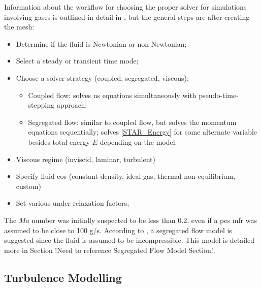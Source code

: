 \documentclass[double,12pt]{beavtex}
\begin{document}
Information about the workflow for choosing the proper solver for simulations involving gases is outlined in detail in \cite{cd-adapco}, but the general steps are after creating the mesh:
\begin{itemize}
    \item Determine if the fluid is Newtonian or non-Newtonian;
    \item Select a steady or transient time mode;
    \item Choose a solver strategy (coupled, segregated, viscous):
    \begin{itemize}
        \item Coupled flow: solves \acrshort{ns} equations simultaneously with pseudo-time-stepping approach;
        \item Segregated flow: similar to coupled flow, but solves the momentum equations sequentially; solves \ref{STAR_Energy} for some alternate variable besides total energy $E$ depending on the model:
    \end{itemize}
    \item Viscous regime (inviscid, laminar, turbulent)
    \item Specify fluid \acrshort{eos} (constant density, ideal gas, thermal non-equilibrium, custom)
    \item Set various under-relaxation factors;
\end{itemize}

The $Ma$ number was initially suspected to be less than 0.2, even if a \acrshort{pcs} \acrshort{mfr} was assumed to be close to 100 g/s. According to \cite{cd-adapco}, a segregated flow model is suggested since the fluid is assumed to be incompressible. This model is detailed more in Section !Need to reference Segregated Flow Model Section!.

\subsection{Turbulence Modelling}
\end{document}
